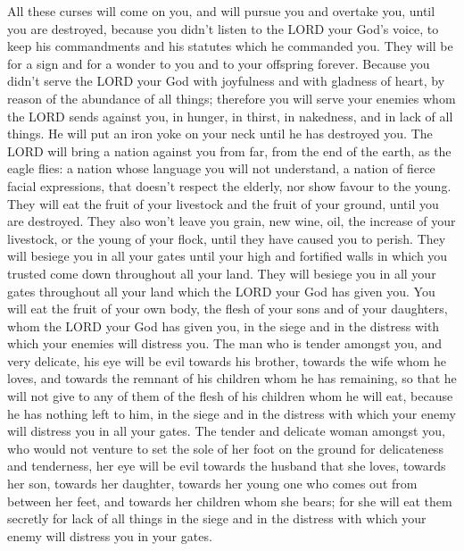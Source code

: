  All these curses will come on you, and will pursue you
and overtake you, until you are destroyed, because you didn't listen to
the LORD your God's voice, to keep his commandments and his statutes
which he commanded you.  They will be for a sign and for
a wonder to you and to your offspring forever.  Because
you didn't serve the LORD your God with joyfulness and with gladness of
heart, by reason of the abundance of all things; 
therefore you will serve your enemies whom the LORD sends against you,
in hunger, in thirst, in nakedness, and in lack of all things. He will
put an iron yoke on your neck until he has destroyed you.
 The LORD will bring a nation against you from far, from
the end of the earth, as the eagle flies: a nation whose language you
will not understand,  a nation of fierce facial
expressions, that doesn't respect the elderly, nor show favour to the
young.  They will eat the fruit of your livestock and the
fruit of your ground, until you are destroyed. They also won't leave you
grain, new wine, oil, the increase of your livestock, or the young of
your flock, until they have caused you to perish.  They
will besiege you in all your gates until your high and fortified walls
in which you trusted come down throughout all your land. They will
besiege you in all your gates throughout all your land which the LORD
your God has given you.  You will eat the fruit of your
own body, the flesh of your sons and of your daughters, whom the LORD
your God has given you, in the siege and in the distress with which your
enemies will distress you.  The man who is tender amongst
you, and very delicate, his eye will be evil towards his brother,
towards the wife whom he loves, and towards the remnant of his children
whom he has remaining,  so that he will not give to any
of them of the flesh of his children whom he will eat, because he has
nothing left to him, in the siege and in the distress with which your
enemy will distress you in all your gates.  The tender
and delicate woman amongst you, who would not venture to set the sole of
her foot on the ground for delicateness and tenderness, her eye will be
evil towards the husband that she loves, towards her son, towards her
daughter,  towards her young one who comes out from
between her feet, and towards her children whom she bears; for she will
eat them secretly for lack of all things in the siege and in the
distress with which your enemy will distress you in your gates.

